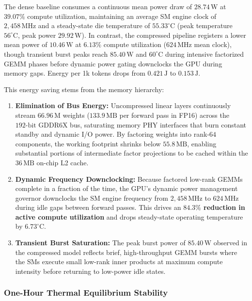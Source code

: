 The dense baseline consumes a continuous mean power draw of $28.74\,\text{W}$ at $39.07\%$ compute utilization, maintaining an average SM engine clock of $2{,}458\,\text{MHz}$ and a steady-state die temperature of $55.33^\circ\text{C}$ (peak temperature $56^\circ\text{C}$, peak power $29.92\,\text{W}$). In contrast, the \neuralops{} compressed pipeline registers a lower mean power of $10.46\,\text{W}$ at $6.13\%$ compute utilization ($624\,\text{MHz}$ mean clock), though transient burst peaks reach $85.40\,\text{W}$ and $60^\circ\text{C}$ during intensive factorized GEMM phases before dynamic power gating downclocks the GPU during memory gaps. Energy per 1k tokens drops from $0.421\,\text{J}$ to $0.153\,\text{J}$.

This energy saving stems from the memory hierarchy:
\begin{enumerate}
    \item \textbf{Elimination of Bus Energy:} Uncompressed linear layers continuously stream $66.96\,\text{M}$ weights ($133.9\,\text{MB}$ per forward pass in FP16) across the $192\text{-bit}$ GDDR6X bus, saturating memory PHY interfaces that burn constant standby and dynamic I/O power. By factoring weights into rank-$64$ components, the working footprint shrinks below $55.8\,\text{MB}$, enabling substantial portions of intermediate factor projections to be cached within the $36\,\text{MB}$ on-chip L2 cache.
    \item \textbf{Dynamic Frequency Downclocking:} Because factored low-rank GEMMs complete in a fraction of the time, the GPU's dynamic power management governor downclocks the SM engine frequency from $2{,}458\,\text{MHz}$ to $624\,\text{MHz}$ during idle gaps between forward passes. This drives an \textbf{$84.3\%$ reduction in active compute utilization} and drops steady-state operating temperature by \textbf{$6.73^\circ\text{C}$}.
    \item \textbf{Transient Burst Saturation:} The peak burst power of $85.40\,\text{W}$ observed in the compressed model reflects brief, high-throughput GEMM bursts where the SMs execute small low-rank inner products at maximum compute intensity before returning to low-power idle states.
\end{enumerate}

\subsubsection{One-Hour Thermal Equilibrium Stability}
\label{sec:results_thermal_equilibrium}

